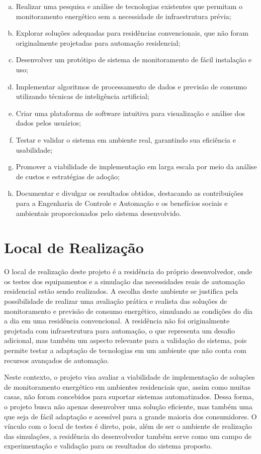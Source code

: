 \begin{enumerate}[a)]
\item Realizar uma pesquisa e análise de tecnologias existentes que permitam o monitoramento energético sem a necessidade de infraestrutura prévia;
\item Explorar soluções adequadas para residências convencionais, que não foram originalmente projetadas para automação residencial;
\item Desenvolver um protótipo de sistema de monitoramento de fácil instalação e uso;
\item Implementar algoritmos de processamento de dados e previsão de consumo utilizando técnicas de inteligência artificial;
\item Criar uma plataforma de software intuitiva para visualização e análise dos dados pelos usuários;
\item Testar e validar o sistema em ambiente real, garantindo sua eficiência e usabilidade;
\item Promover a viabilidade de implementação em larga escala por meio da análise de custos e estratégias de adoção;
\item Documentar e divulgar os resultados obtidos, destacando as contribuições para a Engenharia de Controle e Automação e os benefícios sociais e ambientais proporcionados pelo sistema desenvolvido.
\end{enumerate}

\section{Local de Realização}
\label{sec:empresa}

O local de realização deste projeto é a residência do próprio desenvolvedor, onde os testes dos equipamentos e a simulação das necessidades reais de automação residencial estão sendo realizados. A escolha deste ambiente se justifica pela possibilidade de realizar uma avaliação prática e realista das soluções de monitoramento e previsão de consumo energético, simulando as condições do dia a dia em uma residência convencional. A residência não foi originalmente projetada com infraestrutura para automação, o que representa um desafio adicional, mas também um aspecto relevante para a validação do sistema, pois permite testar a adaptação de tecnologias em um ambiente que não conta com recursos avançados de automação.

Neste contexto, o projeto visa avaliar a viabilidade de implementação de soluções de monitoramento energético em ambientes residenciais que, assim como muitas casas, não foram concebidos para suportar sistemas automatizados. Dessa forma, o projeto busca não apenas desenvolver uma solução eficiente, mas também uma que seja de fácil adaptação e acessível para a grande maioria dos consumidores. O vínculo com o local de testes é direto, pois, além de ser o ambiente de realização das simulações, a residência do desenvolvedor também serve como um campo de experimentação e validação para os resultados do sistema proposto.

